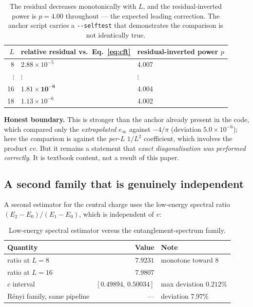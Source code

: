 \documentclass[11pt,a4paper]{article}
\newcommand{\code}[1]{\texttt{\small #1}}
\begin{document}
\begin{table}[h]
\centering\small
\begin{tabular}{@{}rll@{}}
\toprule
$L$ & relative residual vs.\ Eq.~\eqref{eq:cft} & residual-inverted power $p$ \\
\midrule
8  & $2.88\times10^{-5}$ & 4.007 \\
$\vdots$ & $\vdots$ & $\vdots$ \\
16 & $\mathbf{1.81\times10^{-6}}$ & 4.004 \\
18 & $1.13\times10^{-6}$ & 4.002 \\
\bottomrule
\end{tabular}
\caption{The residual decreases monotonically with $L$, and the residual-inverted
power is $p = 4.00$ throughout --- the expected leading correction. The anchor
script carries a \code{-{}-selftest} that demonstrates the comparison is not
identically true.}
\label{tab:anchor}
\end{table}

\noindent\textbf{Honest boundary.} This is stronger than the anchor already present
in the code, which compared only the \emph{extrapolated} $e_\infty$ against
$-4/\pi$ (deviation $5.0\times10^{-6}$); here the comparison is against the
\emph{per-$L$} $1/L^2$ coefficient, which involves the product $cv$. But it remains
a statement that \emph{exact diagonalisation was performed correctly}. It is
textbook content, not a result of this paper.

\subsection{A second family that is genuinely independent}
\label{sec:secondfamily}

A second estimator for the central charge uses the low-energy spectral ratio
$(E_2 - E_0)/(E_1 - E_0)$, which is independent of $v$:

\begin{table}[h]
\centering\small
\begin{tabular}{@{}lrl@{}}
\toprule
\textbf{Quantity} & \textbf{Value} & \textbf{Note} \\
\midrule
ratio at $L{=}8$  & $7.9231$ & monotone toward 8 \\
ratio at $L{=}16$ & $7.9807$ & \\
$c$ interval & $[0.49894,\,0.50034]$ & max deviation $0.212\%$ \\
Rényi family, same pipeline & --- & deviation $7.97\%$ \\
\bottomrule
\end{tabular}
\caption{Low-energy spectral estimator versus the entanglement-spectrum family.}
\label{tab:second}
\end{table}
\end{document}

